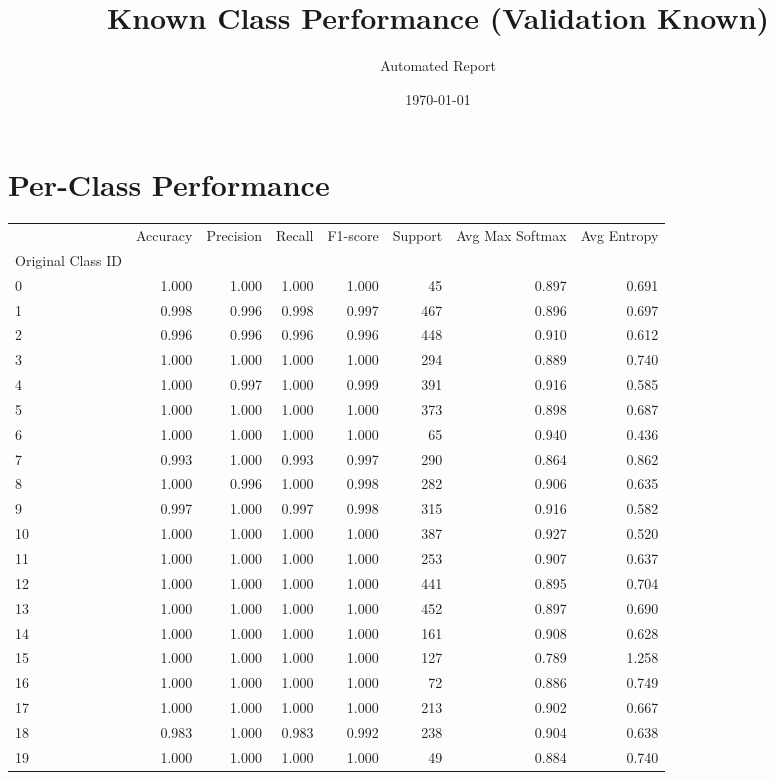 \documentclass{article}
\title{Known Class Performance (Validation Known)}
\date{\today}
\author{Automated Report}
\begin{document}
\maketitle
\section*{Per-Class Performance}
\begin{tabular}{lrrrrrrr}
\toprule
 & Accuracy & Precision & Recall & F1-score & Support & Avg Max Softmax & Avg Entropy \\
Original Class ID &  &  &  &  &  &  &  \\
\midrule
0 & 1.000 & 1.000 & 1.000 & 1.000 & 45 & 0.897 & 0.691 \\
1 & 0.998 & 0.996 & 0.998 & 0.997 & 467 & 0.896 & 0.697 \\
2 & 0.996 & 0.996 & 0.996 & 0.996 & 448 & 0.910 & 0.612 \\
3 & 1.000 & 1.000 & 1.000 & 1.000 & 294 & 0.889 & 0.740 \\
4 & 1.000 & 0.997 & 1.000 & 0.999 & 391 & 0.916 & 0.585 \\
5 & 1.000 & 1.000 & 1.000 & 1.000 & 373 & 0.898 & 0.687 \\
6 & 1.000 & 1.000 & 1.000 & 1.000 & 65 & 0.940 & 0.436 \\
7 & 0.993 & 1.000 & 0.993 & 0.997 & 290 & 0.864 & 0.862 \\
8 & 1.000 & 0.996 & 1.000 & 0.998 & 282 & 0.906 & 0.635 \\
9 & 0.997 & 1.000 & 0.997 & 0.998 & 315 & 0.916 & 0.582 \\
10 & 1.000 & 1.000 & 1.000 & 1.000 & 387 & 0.927 & 0.520 \\
11 & 1.000 & 1.000 & 1.000 & 1.000 & 253 & 0.907 & 0.637 \\
12 & 1.000 & 1.000 & 1.000 & 1.000 & 441 & 0.895 & 0.704 \\
13 & 1.000 & 1.000 & 1.000 & 1.000 & 452 & 0.897 & 0.690 \\
14 & 1.000 & 1.000 & 1.000 & 1.000 & 161 & 0.908 & 0.628 \\
15 & 1.000 & 1.000 & 1.000 & 1.000 & 127 & 0.789 & 1.258 \\
16 & 1.000 & 1.000 & 1.000 & 1.000 & 72 & 0.886 & 0.749 \\
17 & 1.000 & 1.000 & 1.000 & 1.000 & 213 & 0.902 & 0.667 \\
18 & 0.983 & 1.000 & 0.983 & 0.992 & 238 & 0.904 & 0.638 \\
19 & 1.000 & 1.000 & 1.000 & 1.000 & 49 & 0.884 & 0.740 \\

\end{tabular}
\end{document}
